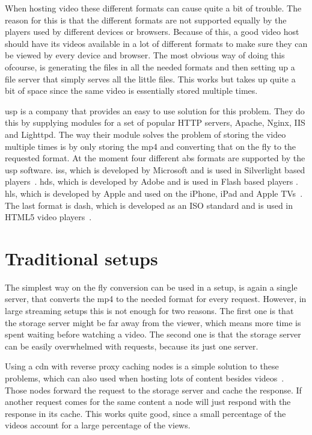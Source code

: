 \documentclass[twoside,openright]{uva-bachelor-thesis}
\begin{document}
When hosting video these different formats can cause quite a bit of trouble.
The reason for this is that the different formats are not supported equally by
the players used by different devices or browsers. Because of this, a good video
host should have its videos available in a lot of different formats to make sure
they can be viewed by every device and browser. The most obvious way of doing
this ofcourse, is generating the files in all the needed formats and then
setting up a file server that simply serves all the little files. This works but
takes up quite a bit of space since the same video is essentially stored
multiple times.

\Gls{usp} is a company that provides an easy to use solution for this problem.
They do this by supplying modules for a set of popular HTTP servers, Apache,
Nginx, IIS and Lighttpd. The way their module solves the problem of storing the
video multiple times is by only storing the mp4 and converting that on the fly
to the requested format. At the moment four different \gls{abs} formats are
supported by the \gls{usp} software. \Gls{iss}, which is developed by Microsoft and is
used in Silverlight based players~\autocite{iss}. \Gls{hds}, which is developed by
Adobe and is used in Flash based players \autocite{hds}.  \Gls{hls}, which is developed
by Apple and used on the iPhone, iPad and Apple TVs~\autocite{hls}. The last
format is \gls{dash}, which is developed as an ISO standard and is used in
\textsc{HTML5} video players~\autocite{dash}.


\section{Traditional setups}
The simplest way on the fly conversion can be used in a setup, is again a
single server, that converts the mp4 to the needed format for every request.
However, in large streaming setups this is not enough for two reasons. The first
one is that the storage server might be far away from the viewer, which means
more time is spent waiting before watching a video. The second one is that the
storage server can be easily overwhelmed with requests, because its just one
server.

Using a \gls{cdn} with reverse proxy caching nodes is a simple solution to these
problems, which can also used when hosting lots of content besides
videos~\autocites{cdns}{revproxy}. Those nodes forward the request to the
storage server and cache the response. If another request comes for the same
content a node will just respond with the response in its cache. This works
quite good, since a small percentage of the videos account for a large
percentage of the views.
\end{document}
